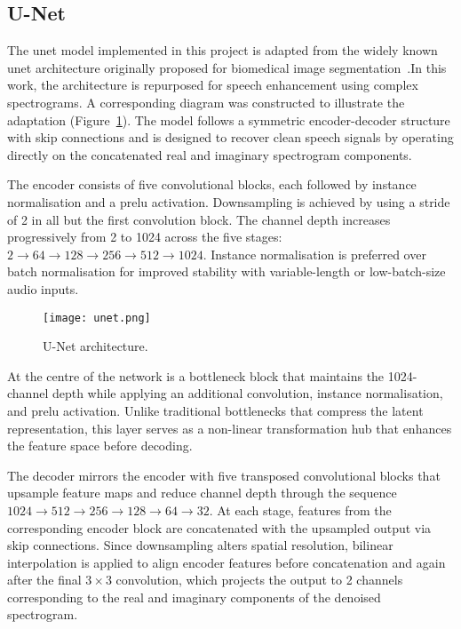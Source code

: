 \subsection{U-Net}
\label{sec:unet}

The \gls{unet} model implemented in this project is adapted from the widely known \gls{unet} architecture originally proposed for biomedical image segmentation~\cite{ronneberger2015unet}.In this work, the architecture is repurposed for speech enhancement using complex spectrograms. A corresponding diagram was constructed to illustrate the adaptation (Figure~\ref{fig:unet}). The model follows a symmetric encoder-decoder structure with skip connections and is designed to recover clean speech signals by operating directly on the concatenated real and imaginary spectrogram components.

The encoder consists of five convolutional blocks, each followed by instance normalisation and a \gls{prelu} activation. Downsampling is achieved by using a stride of 2 in all but the first convolution block. The channel depth increases progressively from 2 to 1024 across the five stages: \(2 \rightarrow 64 \rightarrow 128 \rightarrow 256 \rightarrow 512 \rightarrow 1024\). Instance normalisation is preferred over batch normalisation for improved stability with variable-length or low-batch-size audio inputs.

\begin{figure}[h]
    \centering
    \texttt{[image: unet.png]}
    \caption{\label{fig:unet}U-Net architecture.}
\end{figure}

At the centre of the network is a bottleneck block that maintains the 1024-channel depth while applying an additional convolution, instance normalisation, and \gls{prelu} activation. Unlike traditional bottlenecks that compress the latent representation, this layer serves as a non-linear transformation hub that enhances the feature space before decoding.

The decoder mirrors the encoder with five transposed convolutional blocks that upsample feature maps and reduce channel depth through the sequence \(1024 \rightarrow 512 \rightarrow 256 \rightarrow 128 \rightarrow 64 \rightarrow 32\). At each stage, features from the corresponding encoder block are concatenated with the upsampled output via skip connections. Since downsampling alters spatial resolution, bilinear interpolation is applied to align encoder features before concatenation and again after the final \(3 \times 3\) convolution, which projects the output to 2 channels corresponding to the real and imaginary components of the denoised spectrogram.

